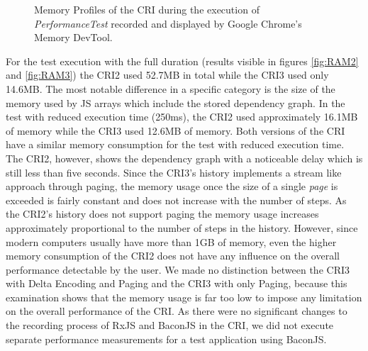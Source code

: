 \begin{figure}[!h]
		\hspace{1cm}
		\caption{Memory Profiles of the CRI during the execution of \emph{PerformanceTest} recorded and displayed by Google Chrome's Memory DevTool.}
	\end{figure}
	For the test execution with the full duration (results visible in figures \ref{fig:RAM2} and \ref{fig:RAM3}) the CRI2 used 52.7MB in total while the CRI3 used only 14.6MB. The most notable difference in a specific category is the size of the memory used by JS arrays which include the stored dependency graph. In the test with reduced execution time (250ms), the CRI2 used approximately 16.1MB of memory while the CRI3 used 12.6MB of memory. Both versions of the CRI have a similar memory consumption for the test with reduced execution time. The CRI2, however, shows the dependency graph with a noticeable delay which is still less than five seconds. Since the CRI3's history implements a stream like approach through paging, the memory usage once the size of a single \emph{page} is exceeded is fairly constant and does not increase with the number of steps. As the CRI2's history does not support paging the memory usage increases approximately proportional to the number of steps in the history. However, since modern computers usually have more than 1GB of memory, even the higher memory consumption of the CRI2 does not have any influence on the overall performance detectable by the user. We made no distinction between the CRI3 with Delta Encoding and Paging and the CRI3 with only Paging, because this examination shows that the memory usage is far too low to impose any limitation on the overall performance of the CRI. As there were no significant changes to the recording process of RxJS and BaconJS in the CRI, we did not execute separate performance measurements for a test application using BaconJS.
	
